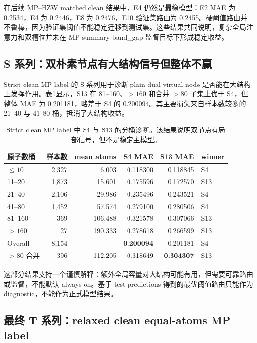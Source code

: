 \documentclass[UTF8,a4paper,11pt]{ctexart}
\newcommand{\NA}{--}
\begin{document}
在后续 MP--HZW matched clean 结果中，E4 仍然是最稳模型：E2 MAE 为 0.2534，E4 为 0.2446，E8 为 0.2476，E10 验证集路由为 0.2455。硬阈值路由并不鲁棒，因为验证集阈值不能稳定迁移到测试集。这些结果共同说明，复杂全局注意力和双槽位并未在 MP summary band\_gap 监督目标下形成稳定收益。

\subsection{S 系列：双朴素节点有大结构信号但整体不赢}

Strict clean MP label 的 S 系列用于诊断 plain dual virtual node 是否能在大结构上发挥作用。表\ref{tab:s-series}显示，S13 在 81--160、$>160$ 和合并 $>80$ 子集上优于 S4，但整体 MAE 为 0.201181，略差于 S4 的 0.200094。其主要损失来自样本数较多的 21--40 与 41--80 桶，抵消了大结构收益。

\begin{table}[htbp]
\centering
\caption{Strict clean MP label 中 S4 与 S13 的分桶诊断。该结果说明双节点有局部信号，但不是稳定主模型。}
\label{tab:s-series}
\small
\begin{tabular}{l r r r r l}
\toprule
原子数桶 & 样本数 & mean atoms & S4 MAE & S13 MAE & winner \\
\midrule
$\leq10$ & 2,327 & 6.003 & 0.118300 & 0.118845 & S4 \\
11--20 & 1,873 & 15.601 & 0.175596 & 0.172570 & S13 \\
21--40 & 2,106 & 29.986 & 0.235496 & 0.243521 & S4 \\
41--80 & 1,452 & 57.574 & 0.279100 & 0.280506 & S4 \\
81--160 & 369 & 106.488 & 0.321578 & 0.307066 & S13 \\
$>160$ & 27 & 190.333 & 0.278618 & 0.266599 & S13 \\
\midrule
Overall & 8,154 & \NA & \textbf{0.200094} & 0.201181 & S4 \\
$>80$ 合并 & 396 & 112.205 & 0.318649 & \textbf{0.304307} & S13 \\
\bottomrule
\end{tabular}
\end{table}

这部分结果支持一个谨慎解释：额外全局容量对大结构可能有用，但需要可靠路由或监督，不能默认 always-on。基于 test predictions 得到的最优阈值路由只能作为 diagnostic，不能作为正式模型结果。

\subsection{最终 T 系列：relaxed clean equal-atoms MP label}
\end{document}
